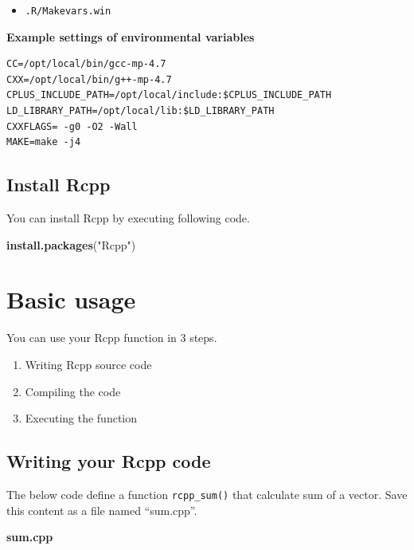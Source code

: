 \documentclass[]{book}
\newenvironment{Shaded}{\begin{snugshade}}{\end{snugshade}}
\newcommand{\KeywordTok}[1]{\textcolor[rgb]{0.13,0.29,0.53}{\textbf{#1}}}
\newcommand{\StringTok}[1]{\textcolor[rgb]{0.31,0.60,0.02}{#1}}
\newcommand{\NormalTok}[1]{#1}
\providecommand{\tightlist}{%
  \setlength{\itemsep}{0pt}\setlength{\parskip}{0pt}}
\theoremstyle{definition}
\theoremstyle{definition}
\theoremstyle{remark}
\begin{document}
\begin{itemize}
\tightlist
\item
  \texttt{.R/Makevars.win}
\end{itemize}

\textbf{Example settings of environmental variables}

\begin{verbatim}
CC=/opt/local/bin/gcc-mp-4.7
CXX=/opt/local/bin/g++-mp-4.7
CPLUS_INCLUDE_PATH=/opt/local/include:$CPLUS_INCLUDE_PATH
LD_LIBRARY_PATH=/opt/local/lib:$LD_LIBRARY_PATH
CXXFLAGS= -g0 -O2 -Wall
MAKE=make -j4
\end{verbatim}

\section{Install Rcpp}\label{install-rcpp}

You can install Rcpp by executing following code.

\begin{Shaded}
\begin{Highlighting}[]
\KeywordTok{install.packages}\NormalTok{(}\StringTok{"Rcpp"}\NormalTok{)}
\end{Highlighting}
\end{Shaded}

\chapter{Basic usage}\label{basic-usage}

You can use your Rcpp function in 3 steps.

\begin{enumerate}
\def\labelenumi{\arabic{enumi}.}
\tightlist
\item
  Writing Rcpp source code
\item
  Compiling the code
\item
  Executing the function
\end{enumerate}

\section{Writing your Rcpp code}\label{writing-your-rcpp-code}

The below code define a function \texttt{rcpp\_sum()} that calculate sum
of a vector. Save this content as a file named ``sum.cpp''.

\textbf{sum.cpp}
\end{document}
